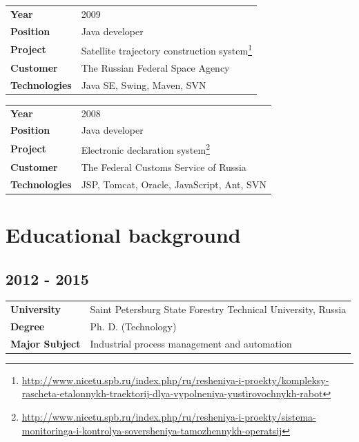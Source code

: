 \documentclass[a4paper,12pt]{article}
\begin{document}
\bigskip

\begin{tabular}{ll}
    \textbf{Year} & 2009 \\
    \textbf{Position} & Java developer \\
    \textbf{Project} & Satellite trajectory construction system\footnote{\url{http://www.nicetu.spb.ru/index.php/ru/resheniya-i-proekty/kompleksy-rascheta-etalonnykh-traektorij-dlya-vypolneniya-yustirovochnykh-rabot}} \\
    \textbf{Customer} & The Russian Federal Space Agency \\
    \textbf{Technologies} & Java SE, Swing, Maven, SVN \\
\end{tabular}

\bigskip

\begin{tabular}{ll}
    \textbf{Year} & 2008 \\
    \textbf{Position} & Java developer \\
    \textbf{Project} & Electronic declaration system\footnote{\url{http://www.nicetu.spb.ru/index.php/ru/resheniya-i-proekty/sistema-monitoringa-i-kontrolya-soversheniya-tamozhennykh-operatsij}} \\
    \textbf{Customer} & The Federal Customs Service of Russia \\
    \textbf{Technologies} & JSP, Tomcat, Oracle, JavaScript, Ant, SVN \\
\end{tabular}


\section*{Educational background}

\subsection*{2012 - 2015}

\begin{tabular}{ll}
    \textbf{University} & Saint Petersburg State Forestry Technical University, Russia \\
    \textbf{Degree} & Ph. D. (Technology) \\
    \textbf{Major Subject} & Industrial process management and automation \\
\end{tabular}
\end{document}
